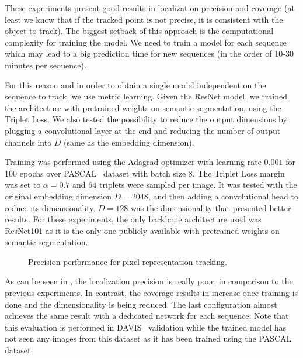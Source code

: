 These experiments present good results in localization precision and coverage (at least we know that if the tracked point is not precise, it is consistent with the object to track).
The biggest setback of this approach is the computational complexity for training the model.
We need to train a model for each sequence which may lead to a big prediction time for new sequences (in the order of 10-30 minutes per sequence).

For this reason and in order to obtain a single model independent on the sequence to track, we use metric learning.
Given the ResNet model, we trained the architecture with pretrained weights on semantic segmentation, using the Triplet Loss.
We also tested the possibility to reduce the output dimensions by plugging a convolutional layer at the end and reducing the number of output channels into $D$ (same as the embedding dimension).

Training was performed using the Adagrad optimizer with learning rate $0.001$ for 100 epochs over PASCAL~\pascal{} dataset with batch size $8$.
The Triplet Loss margin was set to $\alpha = 0.7$ and $64$ triplets were sampled per image.
It was tested with the original embedding dimension $D=2048$, and then adding a convolutional head to reduce its dimensionality.
$D=128$ was the dimensionality that presented better results.
For these experiments, the only backbone architecture used was ResNet101 as it is the only one publicly available with pretrained weights on semantic segmentation.


\begin{figure}[h]
  \centering
  
  \caption{Precision performance for pixel representation tracking.}
  \label{fig:experiments:tracking:metriclearning}
\end{figure}

As can be seen in , the localization precision is really poor, in comparison to the previous experiments.
In contrast, the coverage results in  increase once training is done and the dimensionality is being reduced. The last configuration almost achieves the same result with a dedicated network for each sequence.
Note that this evaluation is performed in DAVIS~\davislast{} validation while the trained model has not seen any images from this dataset as it has been trained using the PASCAL~\pascal{} dataset.


